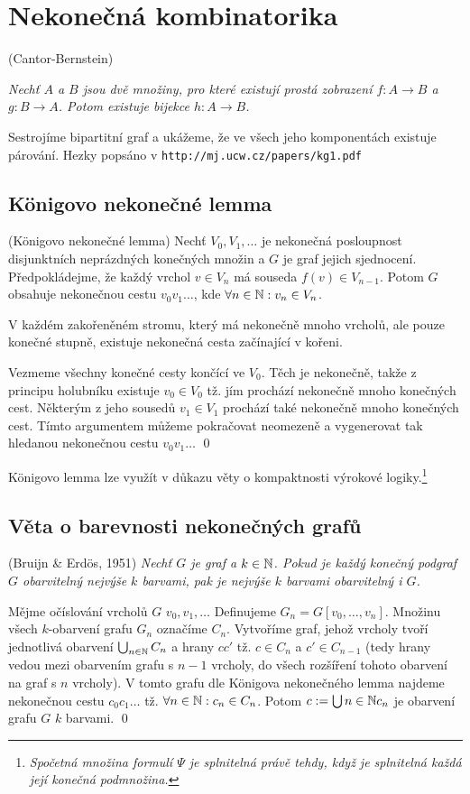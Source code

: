\section{Nekonečná kombinatorika}

\vt (Cantor-Bernstein) {\it Nechť $A$ a $B$ jsou dvě množiny, pro které existují prostá zobrazení $f: A \rightarrow B$ a $g: B \rightarrow A$. Potom existuje bijekce $h: A \rightarrow B$.

\dk Sestrojíme bipartitní graf a ukážeme, že ve všech jeho komponentách existuje párování. Hezky popsáno v \texttt{http://mj.ucw.cz/papers/kg1.pdf}

\subsection{Königovo nekonečné lemma}

\lm (Königovo nekonečné lemma) Nechť $V_0,V_1,\dots$ je nekonečná posloupnost disjunktních neprázdných konečných množin a $G$ je graf jejich sjednocení. Předpokládejme, že každý vrchol $v \in V_n$ má souseda $f(v) \in V_{n-1}$. Potom $G$ obsahuje nekonečnou cestu $v_0v_1\dots$, kde $\forall n\in \mathbb{N}: v_n\in V_n$.

\medskip{} V každém zakořeněném stromu, který má nekonečně mnoho vrcholů, ale pouze konečné stupně, existuje nekonečná cesta začínající v kořeni.

\dk Vezmeme všechny konečné cesty končící ve $V_0$. Těch je nekonečně, takže z principu holubníku existuje $v_0\in V_0$ tž. jím prochází nekonečně mnoho konečných cest. Některým z jeho sousedů $v_1\in V_1$ prochází také nekonečně mnoho konečných cest. Tímto argumentem můžeme pokračovat neomezeně a vygenerovat tak hledanou nekonečnou cestu $v_0v_1\dots$
\qed

Königovo lemma lze využít v důkazu věty o kompaktnosti výrokové logiky.\footnote{\it Spočetná množina formulí $\Psi$ je splnitelná právě tehdy, když je splnitelná každá její konečná podmnožina.}

\subsection{Věta o barevnosti nekonečných grafů}

\vt (Bruijn \& Erdös, 1951) {\it Nechť $G$ je graf a $k\in \mathbb{N}$. Pokud je každý konečný podgraf $G$ obarvitelný nejvýše $k$ barvami, pak je nejvýše $k$ barvami obarvitelný i $G$.}

\dk Mějme očíslování vrcholů $G$ $v_0, v_1, \dots$ Definujeme $G_n = G[v_0,\dots, v_n]$. Množinu všech $k$-obarvení grafu $G_n$ označíme $C_n$. Vytvoříme graf, jehož vrcholy tvoří jednotlivá obarvení $\bigcup_{n\in\mathbb{N}} C_n$ a hrany $cc'$ tž. $c\in C_n$ a $c'\in C_{n-1}$ (tedy hrany vedou mezi obarvením grafu s $n-1$ vrcholy, do všech rozšíření tohoto obarvení na graf s $n$ vrcholy). V tomto grafu dle Königova nekonečného lemma najdeme nekonečnou cestu $c_0c_1\dots$ tž. $\forall n\in\mathbb{N}: c_n \in C_n$. Potom $c := \bigcup{n\in\mathbb{N}}c_n$ je obarvení grafu $G$ $k$ barvami.
\qed

}
